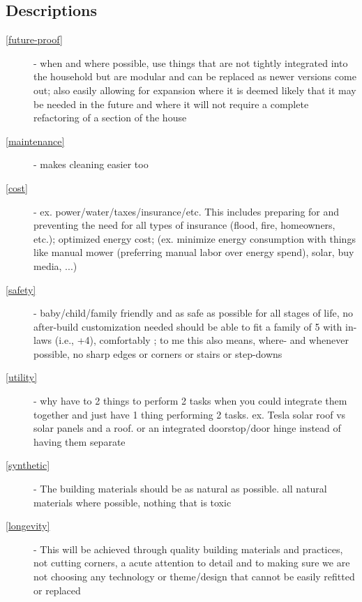 \documentclass{article}
\begin{document}



\clearpage
\subsection{Descriptions}
\begin{description}

\item[\ref{future-proof}] - when and where possible, use things that are not tightly integrated into the household but are modular and can be replaced as newer versions come out; also easily allowing for expansion where it is deemed likely that it may be needed in the future and where it will not require a complete refactoring of a section of the house  
\item[\ref{maintenance}] - makes cleaning easier too
\item[\ref{cost}] - ex. power/water/taxes/insurance/etc. This includes preparing for and preventing the need for all types of insurance (flood, fire, homeowners, etc.); optimized energy cost; (ex. minimize energy consumption with things like manual mower (preferring manual labor over energy spend), solar, buy media, ...)  
\item[\ref{safety}] - baby/child/family friendly and as safe as possible for all stages of life, no after-build customization needed should be able to fit a family of 5 with in-laws (i.e., +4), comfortably ; to me this also means, where- and whenever possible, no sharp edges or corners or stairs or step-downs
\item[\ref{utility}] - why have to 2 things to perform 2 tasks when you could integrate them together and just have 1 thing performing 2 tasks. ex. Tesla solar roof vs solar panels and a roof. or an integrated doorstop/door hinge instead of having them separate  
\item[\ref{synthetic}] - The building materials should be as natural as possible. all natural materials where possible, nothing that is toxic  
\item[\ref{longevity}] - This will be achieved through quality building materials and practices, not cutting corners, a acute attention to detail and to making sure we are not choosing any technology or theme/design that cannot be easily refitted or replaced 
\end{description}
\end{document}
